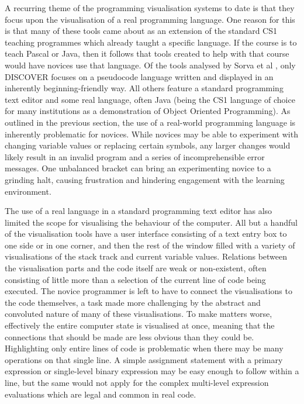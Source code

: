 A recurring theme of the programming visualisation systems to date is that they focus upon the visualisation of a real programming language. One reason for this is that many of these tools came about as an extension of the standard CS1 teaching programmes which already taught a specific language. If the course is to teach Pascal or Java, then it follows that tools created to help with that course would have novices use that language. Of the tools analysed by Sorva et al \cite{Sorva:2013:RGP:2543488.2490822}, only DISCOVER focuses on a pseudocode language written and displayed in an inherently beginning-friendly way. All others feature a standard programming text editor and some real language, often Java (being the CS1 language of choice for many institutions \cite{Hristova:2003:ICJ:792548.611956} as a demonstration of Object Oriented Programming). As outlined in the previous section, the use of a real-world programming language is inherently problematic for novices. While novices may be able to experiment with changing variable values or replacing certain symbols, any larger changes would likely result in an invalid program and a series of incomprehensible error messages. One unbalanced bracket can bring an experimenting novice to a grinding halt, causing frustration and hindering engagement with the learning environment.

The use of a real language in a standard programming text editor has also limited the scope for visualising the behaviour of the computer. All but a handful of the visualisation tools have a user interface consisting of a text entry box to one side or in one corner, and then the rest of the window filled with a variety of visualisations of the stack track and current variable values. Relations between the visualisation parts and the code itself are weak or non-existent, often consisting of little more than a selection of the current line of code being executed. The novice programmer is left to have to connect the visualisations to the code themselves, a task made more challenging by the abstract and convoluted nature of many of these visualisations. To make matters worse, effectively the entire computer state is visualised at once, meaning that the connections that should be made are less obvious than they could be. Highlighting only entire lines of code is problematic when there may be many operations on that single line. A simple assignment statement with a primary expression or single-level binary expression may be easy enough to follow within a line, but the same would not apply for the complex multi-level expression evaluations which are legal and common in real code.

